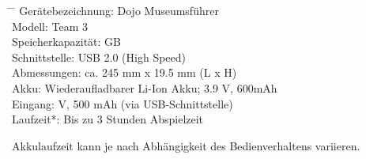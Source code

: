 \begin{tabbing}
\hspace{40mm}		\= \hspace{15mm} \=\kill
Gerätebezeichnung:	\> Dojo Museumsführer \\[4mm]
Modell:				\> Team 3 \\[4mm]
Speicherkapazität:	 GB \\[4mm]
Schnittstelle:		\> USB 2.0 (High Speed) \\[4mm]
Abmessungen:		\> ca. 245 mm x 19.5 mm (L x H) \\[4mm]
Akku:				\> Wiederaufladbarer Li-Ion Akku; 3.9 V, 600mAh \\[4mm]
Eingang:			 V, 500 mAh (via USB-Schnittstelle) \\[4mm]
Laufzeit*:			\> Bis zu 3 Stunden Abspielzeit \\[4mm]
\end{tabbing}

\begin{description}
\item *Akkulaufzeit kann je nach Abhängigkeit des Bedienverhaltens variieren.
\end{description}


